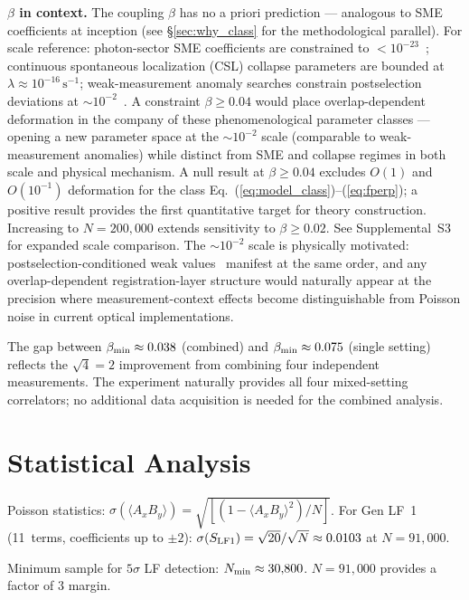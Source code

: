\documentclass[twocolumn,aps,pra,superscriptaddress,floatfix,10pt]{revtex4-2}
\begin{document}
\textbf{$\beta$ in context.} The coupling $\beta$ has no a priori prediction --- analogous to
SME coefficients at inception (see \S\ref{sec:why_class} for the methodological parallel).
For scale reference: photon-sector SME coefficients are constrained to
${<}10^{-23}$~\cite{Colladay1997}; continuous spontaneous localization (CSL) collapse parameters
are bounded at $\lambda \approx 10^{-16}\,\text{s}^{-1}$; weak-measurement anomaly searches constrain
postselection deviations at $\sim\!10^{-2}$~\cite{Aharonov1988}. A constraint $\beta \ge 0.04$ would place
overlap-dependent deformation in the company of these phenomenological
parameter classes --- opening a new parameter space at the $\sim\!10^{-2}$ scale
(comparable to weak-measurement anomalies) while distinct from SME and
collapse regimes in both scale and physical mechanism. A null result at
$\beta \ge 0.04$ excludes $O(1)$ and $O(10^{-1})$ deformation for the class Eq.~(\ref{eq:model_class})--(\ref{eq:fperp});
a positive result provides the first quantitative target for theory
construction. Increasing to $N = 200{,}000$ extends sensitivity to $\beta \ge 0.02$.
See Supplemental~S3 for expanded scale comparison. The $\sim\!10^{-2}$ scale is
physically motivated: postselection-conditioned weak values~\cite{Aharonov1988} manifest
at the same order, and any overlap-dependent registration-layer structure
would naturally appear at the precision where measurement-context effects
become distinguishable from Poisson noise in current optical
implementations.

The gap between $\beta_{\rm min} \approx 0.038$ (combined) and $\beta_{\rm min} \approx 0.075$ (single setting)
reflects the $\sqrt{4} = 2$ improvement from combining four independent measurements.
The experiment naturally provides all four mixed-setting correlators; no
additional data acquisition is needed for the combined analysis.

\section{Statistical Analysis}
\label{sec:statistics}

Poisson statistics: $\sigma(\langle A_x B_y\rangle) = \sqrt{[(1 - \langle A_x B_y\rangle^2) / N]}$. For Gen LF~1
(11~terms, coefficients up to $\pm 2$): $\sigma(S_{\rm LF1}) = \sqrt{20}/\sqrt{N} \approx 0.0103$ at $N = 91{,}000$.

Minimum sample for $5\sigma$ LF detection: $N_{\rm min} \approx 30{,}800$. $N = 91{,}000$ provides a
factor of 3 margin.
\end{document}
